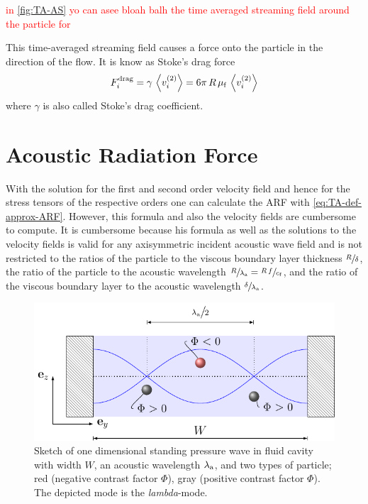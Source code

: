 \textcolor{red}{in \cref{fig:TA-AS} yo can asee bloah balh the time averaged 
streaming field around the particle for}

This time-averaged streaming field causes a force onto the particle in the 
direction of the flow. It is know as Stoke's drag force
\begin{equation}
  F^{\mathrm{drag}}_{i} = \gamma\,\left\langle v_{i}^{(2)} \right\rangle = 
  6\pi\,R\,\mu_{\mathrm{f}}\,\left\langle v_{i}^{(2)} \right\rangle
  \label{eq:TA-drag-force}
\end{equation}
where $\gamma$ is also called Stoke's drag coefficient.


\section{Acoustic Radiation Force\label{sec:TA-ARF}}

With the solution for the first and second order velocity field and hence for 
the stress tensors of the respective orders one can calculate the ARF with 
\cref{eq:TA-def-approx-ARF}. However, this formula and also the velocity fields 
are cumbersome to compute. It is cumbersome because his formula as well as the 
solutions to the velocity fields is valid for any axisymmetric incident 
acoustic wave field and is not restricted to the ratios of the particle to the 
viscous boundary layer thickness $\sfrac{R}{\delta}$, the ratio of the particle 
to the acoustic wavelength $\sfrac{R}{\lambda_{\mathrm{a}}} = 
\sfrac{R\,f}{c_{\mathrm{f}}}$, and the ratio of the viscous boundary layer to the 
acoustic wavelength $\sfrac{\delta}{\lambda_{\mathrm{a}}}$.

\begin{figure}[tbp]
  \centering
  \includegraphics[]{External/lambda_mode.pdf}
  \caption{Sketch of one dimensional standing pressure wave in fluid cavity 
  with width $W$, an acoustic wavelength $\lambda_{\mathrm{a}}$, and two types 
of particle; red (negative contrast factor $\Phi$), gray (positive contrast 
factor $\Phi$). The depicted mode is the \emph{lambda}-mode.}
  \label{fig:TA-lambda_mode}
\end{figure}

